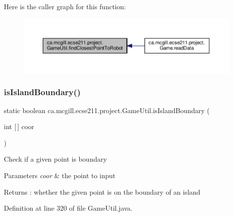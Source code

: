 Here is the caller graph for this function\+:\nopagebreak
\begin{figure}[H]
\begin{center}
\leavevmode
\includegraphics[width=350pt]{classca_1_1mcgill_1_1ecse211_1_1project_1_1_game_util_a6e0ee94b800ca3727ca8009782abda14_icgraph}
\end{center}
\end{figure}
\mbox{\label{classca_1_1mcgill_1_1ecse211_1_1project_1_1_game_util_a5783c3415e13b66362a647504b63741a}} 
\subsubsection{\texorpdfstring{is\+Island\+Boundary()}{isIslandBoundary()}}
{\footnotesize\ttfamily static boolean ca.\+mcgill.\+ecse211.\+project.\+Game\+Util.\+is\+Island\+Boundary (\begin{DoxyParamCaption}\item[{int \mbox{[}$\,$\mbox{]}}]{coor }\end{DoxyParamCaption})\hspace{0.3cm}{\ttfamily [static]}}

Check if a given point is boundary 
\begin{DoxyParams}{Parameters}
{\em coor} & the point to input \\
\hline
\end{DoxyParams}
\begin{DoxyReturn}{Returns}
\+: whether the given point is on the boundary of an island 
\end{DoxyReturn}


Definition at line 320 of file Game\+Util.\+java.


